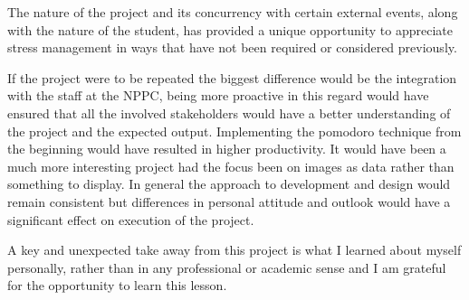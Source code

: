 The nature of the project and its concurrency with certain external events, along with the nature of the student, has provided a unique opportunity to appreciate stress management in ways that have not been required or considered previously.

If the project were to be repeated the biggest difference would be the integration with the staff at the NPPC, being more proactive in this regard would have ensured that all the involved stakeholders would have a better understanding of the project and the expected output. Implementing the pomodoro technique from the beginning would have resulted in higher productivity. It would have been a much more interesting project had the focus been on images as data rather than something to display. In general the approach to development and design would remain consistent but differences in personal attitude and outlook would have a significant effect on execution of the project.

 A key and unexpected take away from this project is what I learned about myself personally, rather than in any professional or academic sense and I am grateful for the opportunity to learn this lesson.


